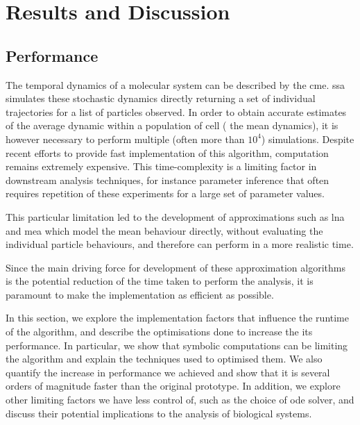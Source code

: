 \section{Results and Discussion} \label{results}



\subsection{Performance}\label{performance}
The temporal dynamics of a molecular system can be described by the \acrfull{cme}\cite{kampen_stochastic_2011}.
\acrfull{ssa}\cite{gillespie_general_1976} simulates these stochastic dynamics directly returning a set of individual trajectories for a list of particles observed.
In order to obtain accurate estimates of the average dynamic within a population of cell (\ie{} the mean dynamics), it is however necessary to perform multiple (often more than $10^4$) simulations.
Despite recent efforts \cite{niemi_efficient_2011,dittamo_optimized_2009,komarov_accelerating_2012} to provide fast implementation of this algorithm, computation remains extremely expensive. 
This time-complexity is a limiting factor in downstream analysis techniques, for
instance parameter inference that often requires repetition of these experiments for a large set of parameter values.

This particular limitation led to the development of approximations such as \acrfull{lna}\cite{komorowski_bayesian_2009} and \acrfull{mea}\cite{ale_general_2013}
 which model the mean behaviour directly, without evaluating the individual particle behaviours, and therefore can perform in a more realistic time.

Since the main driving force for development of these approximation algorithms is the potential reduction of the time taken to perform the analysis, 
it is paramount to make the implementation as efficient as possible.

In this section, we explore the implementation factors that influence the runtime of the algorithm, and describe the optimisations done to increase the its performance.
In particular, we show that symbolic computations can be limiting the algorithm and explain the techniques used to optimised them.
We also quantify the increase in performance we achieved and show that it is several orders of magnitude faster than the original \mat{} prototype.
In addition, we explore other limiting factors we have less control of, such as the choice of \gls{ode} solver, and discuss their potential implications to the analysis of biological systems.

